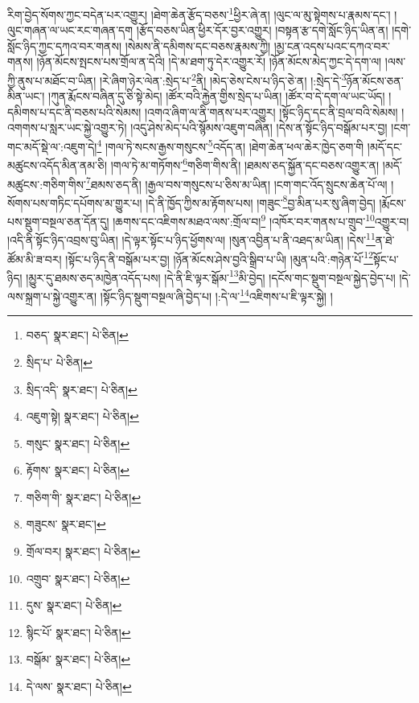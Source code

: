རིག་བྱེད་སོགས་ཀྱང་བདེན་པར་འགྱུར། །ཐེག་ཆེན་རྩོད་བཅས་\footnote{བཅད་  སྣར་ཐང་།  པེ་ཅིན། }ཕྱིར་ཞེ་ན། །ལུང་ལ་མུ་སྟེགས་པ་རྣམས་དང་། །ལུང་གཞན་ལ་ཡང་རང་གཞན་དག །རྩོད་བཅས་ཡིན་ཕྱིར་དོར་བྱར་འགྱུར། །བསྟན་རྩ་དགེ་སློང་ཉིད་ཡིན་ན། །དགེ་སློང་ཉིད་ཀྱང་དཀའ་བར་གནས། །སེམས་ནི་དམིགས་དང་བཅས་རྣམས་ཀྱི། །མྱ་ངན་འདས་པའང་དཀའ་བར་གནས། །ཉོན་མོངས་སྤངས་པས་གྲོལ་ན་དེའི། །དེ་མ་ཐག་ཏུ་དེར་འགྱུར་རོ། །ཉོན་མོངས་མེད་ཀྱང་དེ་དག་ལ། །ལས་ཀྱི་ནུས་པ་མཐོང་བ་ཡིན། །རེ་ཞིག་ཉེར་ལེན་:སྲེད་པ་\footnote{སྲིད་པ་  པེ་ཅིན། }ནི། །མེད་ཅེས་ངེས་པ་ཉིད་ཅེ་ན། །:སྲེད་དེ་\footnote{སྲིད་འདི་  སྣར་ཐང་།  པེ་ཅིན། }ཉོན་མོངས་ཅན་མིན་ཡང་། །ཀུན་རྨོངས་བཞིན་དུ་ཅི་སྟེ་མེད། །ཚོར་བའི་རྐྱེན་གྱིས་སྲེད་པ་ཡིན། །ཚོར་བ་དེ་དག་ལ་ཡང་ཡོད། །དམིགས་པ་དང་ནི་བཅས་པའི་སེམས། །འགའ་ཞིག་ལ་ནི་གནས་པར་འགྱུར། །སྟོང་ཉིད་དང་ནི་བྲལ་བའི་སེམས། །འགགས་པ་སླར་ཡང་སྐྱེ་འགྱུར་ཏེ། །འདུ་ཤེས་མེད་པའི་སྙོམས་འཇུག་བཞིན། །དེས་ན་སྟོང་ཉིད་བསྒོམ་པར་བྱ། །ངག་གང་མདོ་སྡེ་ལ་:འཇུག་དེ།\footnote{འཇུག་སྟེ།  སྣར་ཐང་།  པེ་ཅིན། } །གལ་ཏེ་སངས་རྒྱས་གསུངས་\footnote{གསུང་  སྣར་ཐང་།  པེ་ཅིན། }འདོད་ན། །ཐེག་ཆེན་ཕལ་ཆེར་ཁྱེད་ཅག་གི །མདོ་དང་མཚུངས་འདོད་མིན་ནམ་ཅི། །གལ་ཏེ་མ་གཏོགས་\footnote{རྟོགས་  སྣར་ཐང་།  པེ་ཅིན། }གཅིག་གིས་ནི། །ཐམས་ཅད་སྐྱོན་དང་བཅས་འགྱུར་ན། །མདོ་མཚུངས་:གཅིག་གིས་\footnote{གཅིག་གི་  སྣར་ཐང་།  པེ་ཅིན། }ཐམས་ཅད་ནི། །རྒྱལ་བས་གསུངས་པ་ཅིས་མ་ཡིན། །ངག་གང་འོད་སྲུངས་ཆེན་པོ་ལ། །སོགས་པས་གཏིང་དཔོགས་མ་གྱུར་པ། །དེ་ནི་ཁྱོད་ཀྱིས་མ་རྟོགས་པས། །གཟུང་\footnote{གཟུངས་  སྣར་ཐང་། }བྱ་མིན་པར་སུ་ཞིག་བྱེད། །རྨོངས་པས་སྡུག་བསྔལ་ཅན་དོན་དུ། །ཆགས་དང་འཇིགས་མཐའ་ལས་:གྲོལ་བ།\footnote{གྲོལ་བར།  སྣར་ཐང་།  པེ་ཅིན། } །འཁོར་བར་གནས་པ་གྲུབ་\footnote{འགྲུབ་  སྣར་ཐང་།  པེ་ཅིན། }འགྱུར་བ། །འདི་ནི་སྟོང་ཉིད་འབྲས་བུ་ཡིན། །དེ་ལྟར་སྟོང་པ་ཉིད་ཕྱོགས་ལ། །སུན་འབྱིན་པ་ནི་འཐད་མ་ཡིན། །དེས་\footnote{དུས་  སྣར་ཐང་།  པེ་ཅིན། }ན་ཐེ་ཚོམ་མི་ཟ་བར། །སྟོང་པ་ཉིད་ནི་བསྒོམ་པར་བྱ། །ཉོན་མོངས་ཤེས་བྱའི་སྒྲིབ་པ་ཡི། །མུན་པའི་:གཉེན་པོ་\footnote{སྙིང་པོ་  སྣར་ཐང་།  པེ་ཅིན། }སྟོང་པ་ཉིད། །མྱུར་དུ་ཐམས་ཅད་མཁྱེན་འདོད་པས། །དེ་ནི་ཇི་ལྟར་སྒོམ་\footnote{བསྒོམ་  སྣར་ཐང་།  པེ་ཅིན། }མི་བྱེད། །དངོས་གང་སྡུག་བསྔལ་སྐྱེད་བྱེད་པ། །དེ་ལས་སྐྲག་པ་སྐྱེ་འགྱུར་ན། །སྟོང་ཉིད་སྡུག་བསྔལ་ཞི་བྱེད་པ། །:དེ་ལ་\footnote{དེ་ལས་  སྣར་ཐང་།  པེ་ཅིན། }འཇིགས་པ་ཇི་ལྟར་སྐྱེ། །

